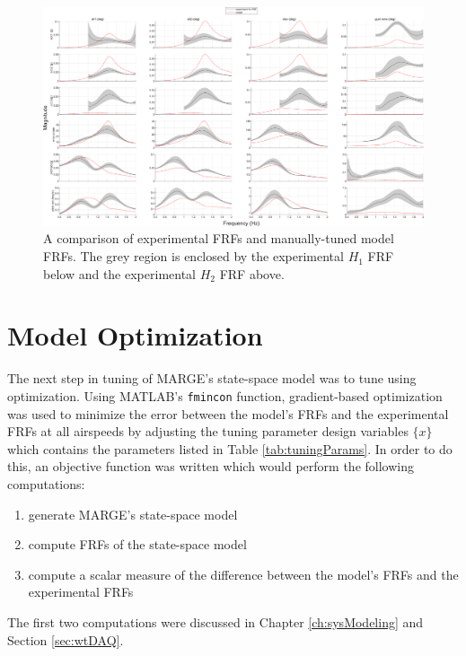 \begin{landscape}

\begin{figure}[H]
	\centering
	\includegraphics[width=9in]{figs/FRFcompare_manualTune_q207.png}
	\caption{A comparison of experimental FRFs and manually-tuned model FRFs. The grey region is enclosed by the experimental $H_1$ FRF below and the experimental $H_2$ FRF above.}
	\label{fig:manualTunedFRF}
\end{figure}

\end{landscape}

\section{Model Optimization} %

The next step in tuning of MARGE's state-space model was to tune using optimization. Using MATLAB's \verb|fmincon| function, gradient-based optimization was used to minimize the error between the model's FRFs and the experimental FRFs at all airspeeds by adjusting the tuning parameter design variables $\{x\}$ which contains the parameters listed in Table \ref{tab:tuningParams}. In order to do this, an objective function was written which would perform the following computations:
\begin{enumerate}
	\item generate MARGE's state-space model
	\item compute FRFs of the state-space model
	\item compute a scalar measure of the difference between the model's FRFs and the experimental FRFs
\end{enumerate}
The first two computations were discussed in Chapter \ref{ch:sysModeling} and Section \ref{sec:wtDAQ}.

